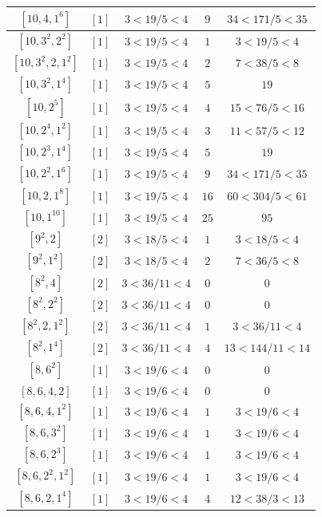 \documentclass{article}%
\begin{document}
\begin{center}
\begin{longtable}{||c|c|c|c|c||}
$[10, 4, 1^{6}]$ & $[1]$ & $3 < 19/5 < 4$ & $9$ & $34 < 171/5 < 35$ \\ \hline 
$[10, 3^{2}, 2^{2}]$ & $[1]$ & $3 < 19/5 < 4$ & $1$ & $3 < 19/5 < 4$ \\ \hline 
$[10, 3^{2}, 2, 1^{2}]$ & $[1]$ & $3 < 19/5 < 4$ & $2$ & $7 < 38/5 < 8$ \\ \hline 
$[10, 3^{2}, 1^{4}]$ & $[1]$ & $3 < 19/5 < 4$ & $5$ & $19$ \\ \hline 
$[10, 2^{5}]$ & $[1]$ & $3 < 19/5 < 4$ & $4$ & $15 < 76/5 < 16$ \\ \hline 
$[10, 2^{4}, 1^{2}]$ & $[1]$ & $3 < 19/5 < 4$ & $3$ & $11 < 57/5 < 12$ \\ \hline 
$[10, 2^{3}, 1^{4}]$ & $[1]$ & $3 < 19/5 < 4$ & $5$ & $19$ \\ \hline 
$[10, 2^{2}, 1^{6}]$ & $[1]$ & $3 < 19/5 < 4$ & $9$ & $34 < 171/5 < 35$ \\ \hline 
$[10, 2, 1^{8}]$ & $[1]$ & $3 < 19/5 < 4$ & $16$ & $60 < 304/5 < 61$ \\ \hline 
$[10, 1^{10}]$ & $[1]$ & $3 < 19/5 < 4$ & $25$ & $95$ \\ \hline 
$[9^{2}, 2]$ & $[2]$ & $3 < 18/5 < 4$ & $1$ & $3 < 18/5 < 4$ \\ \hline 
$[9^{2}, 1^{2}]$ & $[2]$ & $3 < 18/5 < 4$ & $2$ & $7 < 36/5 < 8$ \\ \hline 
$[8^{2}, 4]$ & $[2]$ & $3 < 36/11 < 4$ & $0$ & $0$ \\ \hline 
$[8^{2}, 2^{2}]$ & $[2]$ & $3 < 36/11 < 4$ & $0$ & $0$ \\ \hline 
$[8^{2}, 2, 1^{2}]$ & $[2]$ & $3 < 36/11 < 4$ & $1$ & $3 < 36/11 < 4$ \\ \hline 
$[8^{2}, 1^{4}]$ & $[2]$ & $3 < 36/11 < 4$ & $4$ & $13 < 144/11 < 14$ \\ \hline 
$[8, 6^{2}]$ & $[1]$ & $3 < 19/6 < 4$ & $0$ & $0$ \\ \hline 
$[8, 6, 4, 2]$ & $[1]$ & $3 < 19/6 < 4$ & $0$ & $0$ \\ \hline 
$[8, 6, 4, 1^{2}]$ & $[1]$ & $3 < 19/6 < 4$ & $1$ & $3 < 19/6 < 4$ \\ \hline 
$[8, 6, 3^{2}]$ & $[1]$ & $3 < 19/6 < 4$ & $1$ & $3 < 19/6 < 4$ \\ \hline 
$[8, 6, 2^{3}]$ & $[1]$ & $3 < 19/6 < 4$ & $1$ & $3 < 19/6 < 4$ \\ \hline 
$[8, 6, 2^{2}, 1^{2}]$ & $[1]$ & $3 < 19/6 < 4$ & $1$ & $3 < 19/6 < 4$ \\ \hline 
$[8, 6, 2, 1^{4}]$ & $[1]$ & $3 < 19/6 < 4$ & $4$ & $12 < 38/3 < 13$ \\ \hline 

\end{longtable}
\end{center}
\end{document}
